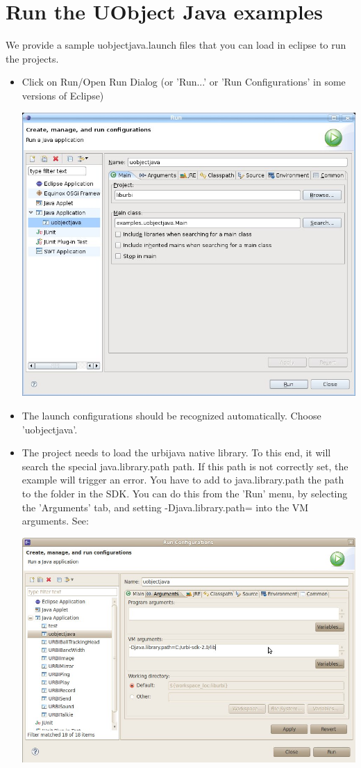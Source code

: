 \section{Run the UObject Java examples}
\label{sec:uob:apijava:import}


We provide a sample uobjectjava.launch files that you can load in eclipse to
run the projects.

\begin{itemize}
\item Click on Run/Open Run Dialog (or 'Run...' or 'Run Configurations' in
  some versions of Eclipse)

\begin{center}
  \includegraphics[width=0.6\linewidth]{img/run-uobjectjava}
\end{center}

\item The launch configurations should be recognized automatically. Choose 'uobjectjava'.

\item The project needs to load the urbijava native library. To this end, it will search the special
java.library.path path. If this path is not correctly set, the example will trigger an error.
You have to add to java.library.path the path to the  folder in the \urbi SDK. You can do
this from the 'Run' menu, by selecting the 'Arguments' tab, and setting -Djava.library.path=
into the VM arguments. See:

\begin{center}
  \includegraphics[width=0.6\linewidth]{img/set_javalibrarypath}
\end{center}


\end{itemize}
